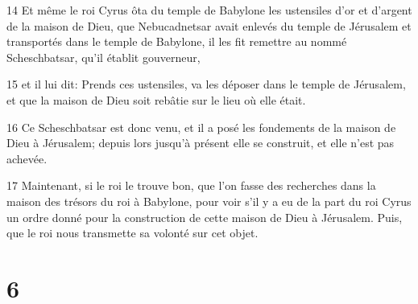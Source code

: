 \par 14 Et même le roi Cyrus ôta du temple de Babylone les ustensiles d'or et d'argent de la maison de Dieu, que Nebucadnetsar avait enlevés du temple de Jérusalem et transportés dans le temple de Babylone, il les fit remettre au nommé Scheschbatsar, qu'il établit gouverneur,
\par 15 et il lui dit: Prends ces ustensiles, va les déposer dans le temple de Jérusalem, et que la maison de Dieu soit rebâtie sur le lieu où elle était.
\par 16 Ce Scheschbatsar est donc venu, et il a posé les fondements de la maison de Dieu à Jérusalem; depuis lors jusqu'à présent elle se construit, et elle n'est pas achevée.
\par 17 Maintenant, si le roi le trouve bon, que l'on fasse des recherches dans la maison des trésors du roi à Babylone, pour voir s'il y a eu de la part du roi Cyrus un ordre donné pour la construction de cette maison de Dieu à Jérusalem. Puis, que le roi nous transmette sa volonté sur cet objet.

\chapter{6}

